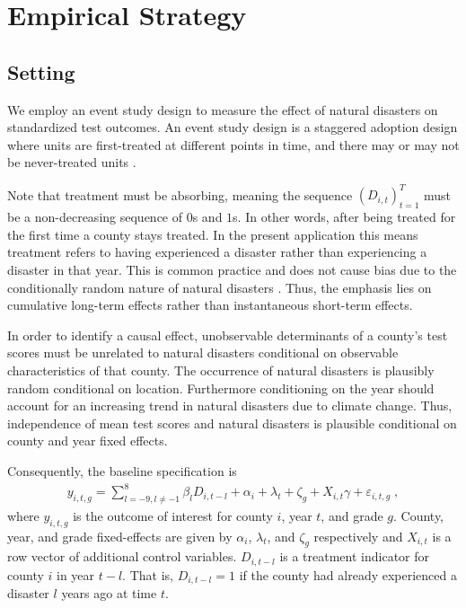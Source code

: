 
\section{Empirical Strategy} \label{EmpStrat}

\subsection{Setting}

We employ an event study design to measure the effect of natural disasters on standardized test outcomes. An event study design is a staggered adoption design where units are first-treated at different points in time, and there may or may not be never-treated units \citep{Sun_2021}.

Note that treatment must be absorbing, meaning the sequence $(D_{i, t})_{t=1}^T$ must be a non-decreasing sequence of $0$s and $1$s. In other words, after being treated for the first time a county stays treated. In the present application this means treatment refers to having experienced a disaster rather than experiencing a disaster in that year. This is common practice and does not cause bias due to the conditionally random nature of natural disasters \citep{Deryugina_2017}. Thus, the emphasis lies on cumulative long-term effects rather than instantaneous short-term effects.

In order to identify a causal effect, unobservable determinants of a county's test scores must be unrelated to natural disasters conditional on observable characteristics of that county. The occurrence of natural disasters is plausibly random conditional on location. Furthermore conditioning on the year should account for an increasing trend in natural disasters due to climate change. Thus, independence of mean test scores and natural disasters is plausible conditional on county and year fixed effects.

Consequently, the baseline specification is
\begin{align} \label{baseline}
	y_{i, t, g} = \sum_{l = -9, l \neq -1}^{8} \beta_l D_{i, t-l} + \alpha_i + \lambda_t + \zeta_g + X_{i, t} \gamma + \varepsilon_{i, t, g} \;,
\end{align}
where $y_{i, t, g}$ is the outcome of interest for county $i$, year $t$, and grade $g$. County, year, and grade fixed-effects are given by $\alpha_i$, $\lambda_t$, and $\zeta_g$ respectively and $X_{i, t}$ is a row vector of additional control variables. $D_{i, t-l}$ is a treatment indicator for county $i$ in year $t-l$. That is, $D_{i, t-l} = 1$ if the county had already experienced a disaster $l$ years ago at time $t$.

